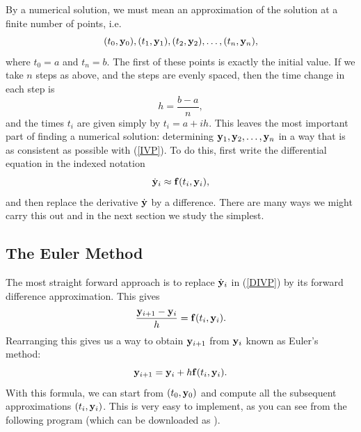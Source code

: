 By a numerical solution, we must mean an approximation of the solution
at a finite number of points, i.e.
$$
(t_0,\mathbf{y}_0), (t_1,\mathbf{y}_1), (t_2,\mathbf{y}_2), \ldots, (t_n,\mathbf{y}_n),
$$
where $t_0 = a$ and $t_n = b$.
The first of these points is exactly the initial value. If we take
$n$ steps as above, and the steps are evenly spaced, then the time
change in each step is
\begin{equation}\label{hdef}
   h = \frac{b-a}{n},
\end{equation}
and the times $t_i$ are given simply by $t_i = a + ih$.
This leaves the most important part of finding a numerical solution:
determining $\mathbf{y}_1, \mathbf{y}_2, \ldots, \mathbf{y}_n$ in a way that is as consistent
as possible with (\ref{IVP}). To do this, first write the differential
equation in the indexed notation
\begin{equation}\label{DIVP}
    \dot{\mathbf{y}}_i \approx \mathbf{f}(t_i,\mathbf{y}_i),
\end{equation}
and then replace the derivative $\dot{\mathbf{y}}$ by a
difference. There are many ways we might carry this out and in the
next section we study the simplest.


\subsection*{The Euler Method}

The most straight forward approach is to replace $\dot{\mathbf{y}}_i$
in (\ref{DIVP}) by its forward difference approximation. This gives
$$
   \frac{\mathbf{y}_{i+1} - \mathbf{y}_i}{h} = \mathbf{f}(t_i,\mathbf{y}_i).
$$
Rearranging this gives us a way to obtain $\mathbf{y}_{i+1}$ from $\mathbf{y}_i$ known
as Euler's method:
\begin{equation}\label{Euler}
\mathbf{y}_{i+1} = \mathbf{y}_i + h \mathbf{f}(t_i,\mathbf{y}_i).
\end{equation}
With this formula, we can start from $(t_0,\mathbf{y}_0)$ and compute all the
subsequent approximations $(t_i,\mathbf{y}_i)$. This is very easy to implement,
as you can see from the following program (which can be downloaded as ).


